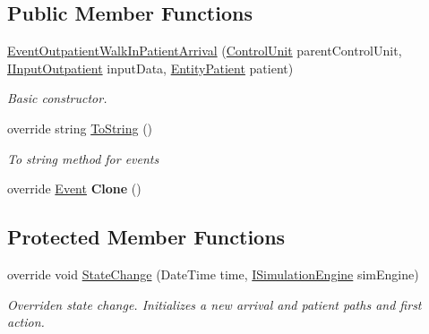 \subsection*{Public Member Functions}
\begin{DoxyCompactItemize}
\item 
\hyperlink{class_general_health_care_elements_1_1_department_models_1_1_outpatient_1_1_event_outpatient_walk_in_patient_arrival_a8a35bcbf2156d70af5d7e65025efbe9f}{Event\+Outpatient\+Walk\+In\+Patient\+Arrival} (\hyperlink{class_simulation_core_1_1_h_c_c_m_elements_1_1_control_unit}{Control\+Unit} parent\+Control\+Unit, \hyperlink{interface_general_health_care_elements_1_1_department_models_1_1_outpatient_1_1_i_input_outpatient}{I\+Input\+Outpatient} input\+Data, \hyperlink{class_general_health_care_elements_1_1_entities_1_1_entity_patient}{Entity\+Patient} patient)
\begin{DoxyCompactList}\small\item\em Basic constructor. \end{DoxyCompactList}\item 
override string \hyperlink{class_general_health_care_elements_1_1_department_models_1_1_outpatient_1_1_event_outpatient_walk_in_patient_arrival_a404d473cb84d6bad14a94955aaf5f517}{To\+String} ()
\begin{DoxyCompactList}\small\item\em To string method for events \end{DoxyCompactList}\item 
override \hyperlink{class_simulation_core_1_1_h_c_c_m_elements_1_1_event}{Event} {\bfseries Clone} ()\hypertarget{class_general_health_care_elements_1_1_department_models_1_1_outpatient_1_1_event_outpatient_walk_in_patient_arrival_ae406b22204da2c38b2147d1d7e0e00a7}{}\label{class_general_health_care_elements_1_1_department_models_1_1_outpatient_1_1_event_outpatient_walk_in_patient_arrival_ae406b22204da2c38b2147d1d7e0e00a7}

\end{DoxyCompactItemize}
\subsection*{Protected Member Functions}
\begin{DoxyCompactItemize}
\item 
override void \hyperlink{class_general_health_care_elements_1_1_department_models_1_1_outpatient_1_1_event_outpatient_walk_in_patient_arrival_a7d1d5b3757f59f470523eed185a87b5c}{State\+Change} (Date\+Time time, \hyperlink{interface_simulation_core_1_1_simulation_classes_1_1_i_simulation_engine}{I\+Simulation\+Engine} sim\+Engine)
\begin{DoxyCompactList}\small\item\em Overriden state change. Initializes a new arrival and patient paths and first action. \end{DoxyCompactList}\end{DoxyCompactItemize}
